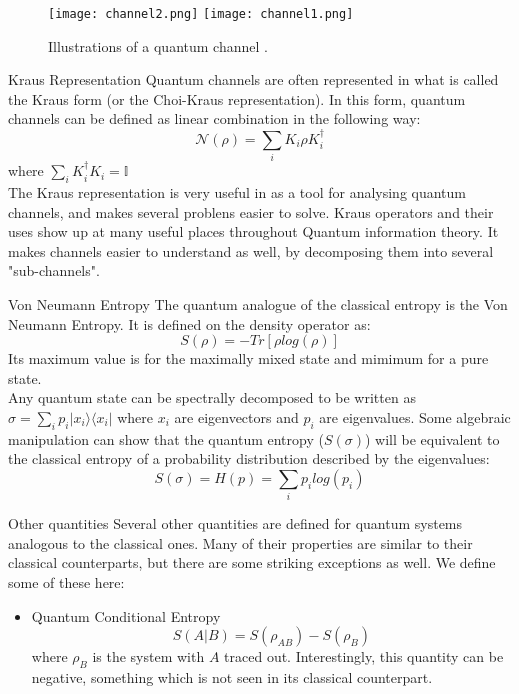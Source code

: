 \begin{frame}
    \begin{figure}
        \texttt{[image: channel2.png]}
        \texttt{[image: channel1.png]}
        \caption{Illustrations of a quantum channel \cite{Gyongyosi_2018}.}
    \end{figure}
\end{frame}

\begin{frame}{Kraus Representation}
    Quantum channels are often represented in what is called the Kraus form (or the Choi-Kraus representation). In this form, quantum channels can be defined
    as linear combination in the following way:
    \begin{equation}
        \mathcal{N}(\rho) = \sum_i K_i \rho K_i^\dagger 
    \end{equation}
    where $\sum_i K_i^\dagger K_i = \mathbb{I} $\\
    The Kraus representation is very useful in as a tool for analysing quantum channels, and makes several problens easier to solve. Kraus operators and their
    uses show up at many useful places throughout Quantum information theory. It makes channels easier to understand as well, by decomposing them into several
    "sub-channels".
\end{frame}

\begin{frame}{Von Neumann Entropy}
    The quantum analogue of the classical entropy is the Von Neumann Entropy. It is defined on the density operator as:
    \begin{equation}
        S(\rho) = -Tr[\rho log(\rho)]
    \end{equation}
    Its maximum value is for the maximally mixed state and mimimum for a pure state.\\
    Any quantum state can be spectrally decomposed to be written as $\sigma = \sum_{i}p_i | x_i \rangle \langle x_i |$ where ${x_i}$ are eigenvectors
    and ${p_i}$ are eigenvalues. Some algebraic manipulation can show that the quantum entropy ($S(\sigma)$) will be equivalent to the classical entropy of
    a probability distribution described by the eigenvalues:
    \begin{equation}
        S(\sigma) = H(p) = \sum_i p_i log(p_i)
    \end{equation}
\end{frame}

\begin{frame}{Other quantities}
    Several other quantities are defined for quantum systems analogous to the classical ones. Many of their properties are similar to their classical counterparts,
    but there are some striking exceptions as well. We define some of these here:
    \begin{itemize}
        \item Quantum Conditional Entropy
        $$S(A|B) = S(\rho_{AB}) - S(\rho_B)$$
        where $\rho_B$ is the system with $A$ traced out. Interestingly, this quantity can be negative, something which is not seen in its classical counterpart.
    \end{itemize}
\end{frame}


